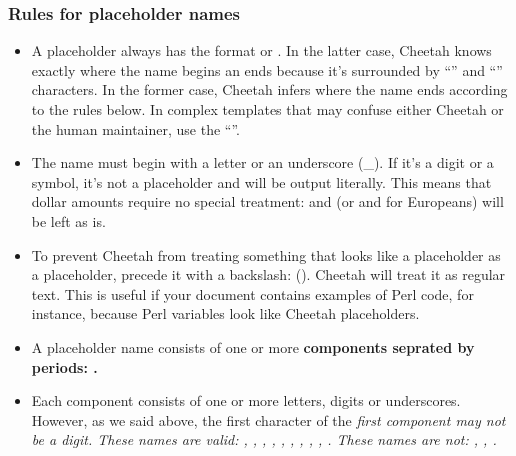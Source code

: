 \begin{enumerate}


\subsubsection{Rules for placeholder names}
\begin{itemize} 

\item A placeholder always has the format  or .
     In the latter case, Cheetah knows exactly where the name begins an ends
     because it's surrounded by ``{'' and ``}'' characters.  In the former
     case, Cheetah infers where the name ends according to the rules below.  In
     complex templates that may confuse either Cheetah or the human maintainer,
     use the ``{}''.

\item The name must begin with a letter or an underscore (_).  If it's a digit
     or a symbol, it's not a placeholder and will be output literally.  This 
     means that dollar amounts require no special treatment: 
     and  (or  and  for
     Europeans) will be left as is.
     
\item To prevent Cheetah from treating something that looks like a placeholder
     as a placeholder, precede it with a backslash: 
     ().  Cheetah will treat it as regular text.
     This is useful if your document contains examples of Perl code, for
     instance, because Perl variables look like Cheetah placeholders.

\item A placeholder name consists of one or more \bf{components} seprated by
     periods:   .

\item Each component consists of one or more letters, digits or underscores.
     However, as we said above, the first character of the \em{first}
     component may not be a digit.  These names are valid: ,
     \code{\$_}, , , , ,
     , , ,
     .  These names are not: , ,
     .


\end{itemize}
\end{enumerate}

